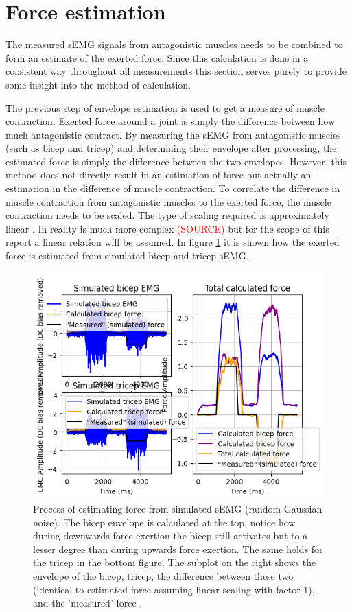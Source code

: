 \section{Force estimation}
The measured sEMG signals from antagonistic muscles needs to be combined to form an estimate of the exerted force. Since this calculation is done in a consistent way throughout all measurements this section serves purely to provide some insight into the method of calculation.

The previous step of envelope estimation is used to get a measure of muscle contraction. Exerted force around a joint is simply the difference between how much antagonistic contract. By measuring the sEMG from antagonistic muscles (such as bicep and tricep) and determining their envelope after processing, the estimated force is simply the difference between the two envelopes. However, this method does not directly result in an estimation of force but actually an estimation in the difference of muscle contraction. To correlate the difference in muscle contraction from antagonistic muscles to the exerted force, the muscle contraction needs to be scaled. The type of scaling required is approximately linear \cite{adaptive_filter_dry_electrode}. In reality is much more complex \textcolor{red}{(SOURCE)} but for the scope of this report a linear relation will be assumed. In figure \ref{fig:force_simulation} it is shown how the exerted force is estimated from simulated bicep and tricep sEMG. 

\begin{figure}[h!t]
	\begin{center}
		\includegraphics[width=0.7\columnwidth]{images/force_simulation.png}
	\end{center}
	\caption{Process of estimating force from simulated sEMG (random Gaussian noise). The bicep envelope is calculated at the top, notice how during downwards force exertion the bicep still activates but to a lesser degree than during upwards force exertion. The same holds for the tricep in the bottom figure. The subplot on the right shows the envelope of the bicep, tricep, the difference between these two (identical to estimated force assuming linear scaling with factor 1), and the 'measured' force .}
	\label{fig:force_simulation}
\end{figure}

